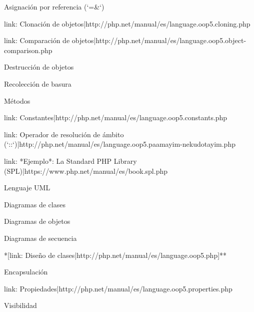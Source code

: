 \begin{longenum}
\begin{longenum}
\begin{longenum}
            \begin{longenum}
                \item Asignación por referencia (`=&`)
            \end{longenum}
            \item [link: Clonación de objetos|http://php.net/manual/es/language.oop5.cloning.php]
            \item [link: Comparación de objetos|http://php.net/manual/es/language.oop5.object-comparison.php]
            \item Destrucción de objetos
            \begin{longenum}
                \item Recolección de basura
            \end{longenum}
            \item Métodos
            \item [link: Constantes|http://php.net/manual/es/language.oop5.constants.php]
            \begin{longenum}
                \item [link: Operador de resolución de ámbito (`::`)|http://php.net/manual/es/language.oop5.paamayim-nekudotayim.php]
            \end{longenum}
            \item [link: *Ejemplo*: La Standard PHP Library (SPL)|https://www.php.net/manual/es/book.spl.php]
        \end{longenum}
        \item Lenguaje UML
        \begin{longenum}
            \item Diagramas de clases
            \item Diagramas de objetos
            \item Diagramas de secuencia
        \end{longenum}
    \end{longenum}
    \item **[link: Diseño de clases|http://php.net/manual/es/language.oop5.php]**
    \begin{longenum}
        \item Encapsulación
        \item [link: Propiedades|http://php.net/manual/es/language.oop5.properties.php]
        \begin{longenum}
            \item Visibilidad
            \begin{longenum}

\end{longenum}
\end{longenum}
\end{longenum}
\end{longenum}
